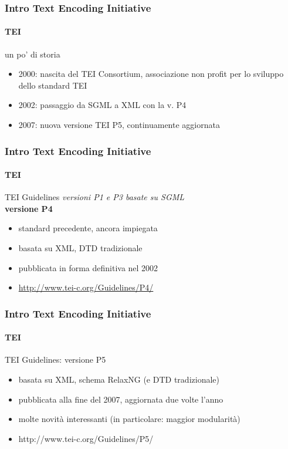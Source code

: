 \begin{frame}
	\frametitle{Intro Text Encoding Initiative}
	\framesubtitle{TEI}
	\addtocounter{nframe}{1}

	\begin{block}{un po' di storia}
		\begin{itemize}
			\item 2000: nascita del TEI Consortium, associazione non profit per lo sviluppo dello standard TEI
			\item 2002: passaggio da SGML a XML con la v. P4
			\item 2007: nuova versione TEI P5, continuamente aggiornata
		\end{itemize}
	\end{block}

\end{frame}


\begin{frame}
    \frametitle{Intro Text Encoding Initiative}
    \framesubtitle{TEI}
    \addtocounter{nframe}{1}

	\begin{block}{TEI Guidelines}
		\textit{versioni P1 e P3 basate su SGML}
		\\\textbf{versione P4}
		\begin{itemize}
			\item standard precedente, ancora impiegata
			\item basata su XML, DTD tradizionale
			\item pubblicata in forma definitiva nel 2002
			\item \url{http://www.tei-c.org/Guidelines/P4/}
		\end{itemize}
    \end{block}
    
\end{frame}

\begin{frame}
	\frametitle{Intro Text Encoding Initiative}
	\framesubtitle{TEI}
	\addtocounter{nframe}{1}

	\begin{block}{TEI Guidelines: versione P5}
		\begin{itemize}
			\item basata su XML, schema RelaxNG (e DTD tradizionale)
			\item pubblicata alla fine del 2007, aggiornata due volte l’anno
			\item molte novità interessanti (in particolare: maggior modularità)
			\item  http://www.tei-c.org/Guidelines/P5/
		\end{itemize}
	\end{block}

\end{frame}

